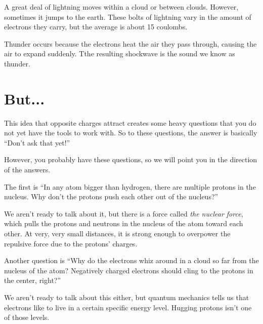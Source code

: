 A great deal of lightning moves within a cloud or between clouds. However, sometimes it jumps to the earth. These bolts of lightning vary in the amount of
electrons they carry, but the average is about 15 coulombs.

Thunder occurs because the electrons heat the air they pass through, 
causing the air to expand suddenly. Tthe resulting shockwave is the sound we know as thunder.
\section{But...}

This idea that opposite charges attract creates some heavy questions
that you do not yet have the tools to work with. So to these questions, the answer is
basically ``Don't ask that yet!''

However, you probably have these questions, so we will point you in
the direction of the answers.

The first is ``In any atom bigger than hydrogen, there are multiple
protons in the nucleus. Why don't the protons push each other out of
the nucleus?''

We aren't ready to talk about it, but there is a force called \textit{the
 nuclear force}, which pulls the protons and neutrons in the nucleus
of the atom toward each other. At very, very small distances, it is
strong enough to overpower the repulsive force due to the protons'
charges.

Another question is ``Why do the electrons whiz around in a cloud so
far from the nucleus of the atom? Negatively charged electrons should
cling to the protons in the center, right?''

We aren't ready to talk about this either, but quantum mechanics tells us that
electrons like to live in a certain specific energy level. Hugging
protons isn't one of those levels.
